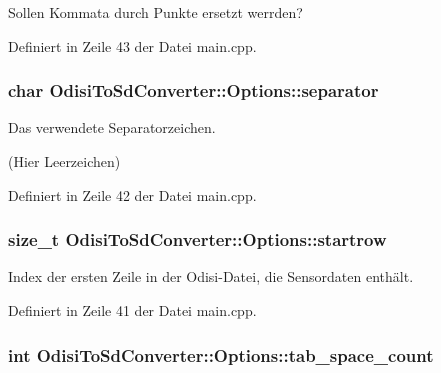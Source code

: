 Sollen Kommata durch Punkte ersetzt werrden? 



Definiert in Zeile 43 der Datei main.\-cpp.

\hypertarget{structOdisiToSdConverter_1_1Options_ae4c74d1fdfbaf37eb4b38f4b684cfa31}{
\subsubsection[{separator}]{\setlength{\rightskip}{0pt plus 5cm}char Odisi\-To\-Sd\-Converter\-::\-Options\-::separator}}\label{structOdisiToSdConverter_1_1Options_ae4c74d1fdfbaf37eb4b38f4b684cfa31}


Das verwendete Separatorzeichen. 

(Hier Leerzeichen) 

Definiert in Zeile 42 der Datei main.\-cpp.

\hypertarget{structOdisiToSdConverter_1_1Options_acb8ca8c36555d0fa3d1b87e2c8800fe6}{
\subsubsection[{startrow}]{\setlength{\rightskip}{0pt plus 5cm}size\-\_\-t Odisi\-To\-Sd\-Converter\-::\-Options\-::startrow}}\label{structOdisiToSdConverter_1_1Options_acb8ca8c36555d0fa3d1b87e2c8800fe6}


Index der ersten Zeile in der Odisi-\/\-Datei, die Sensordaten enthält. 



Definiert in Zeile 41 der Datei main.\-cpp.

\hypertarget{structOdisiToSdConverter_1_1Options_a7dda0229b360a29cd7e4b1ed26e2e71d}{
\subsubsection[{tab\-\_\-space\-\_\-count}]{\setlength{\rightskip}{0pt plus 5cm}int Odisi\-To\-Sd\-Converter\-::\-Options\-::tab\-\_\-space\-\_\-count}}\label{structOdisiToSdConverter_1_1Options_a7dda0229b360a29cd7e4b1ed26e2e71d}


